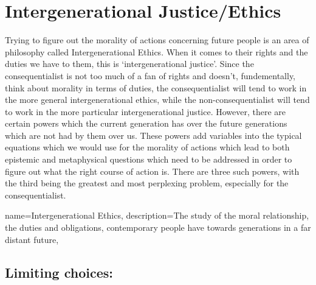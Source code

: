 \section{Intergenerational Justice/Ethics}

Trying to figure out the morality of actions concerning future people is an area of philosophy called \gls{Intergenerational Ethics}. When it comes to their rights and the duties we have to them, this is `intergenerational justice'. Since the consequentialist is not too much of a fan of rights and doesn't, fundementally, think about morality in terms of duties, the consequentialist will tend to work in the more general intergenerational ethics, while the non-consequentialist will tend to work in the more particular intergenerational justice. However, there are certain powers which the current generation has over the future generations which are not had by them over us. These powers add variables into the typical equations which we would use for the morality of actions which lead to both epistemic and metaphysical questions which need to be addressed in order to figure out what the right course of action is. There are three such powers, with the third being the greatest and most perplexing problem, especially for the consequentialist.

{
  name=Intergenerational Ethics,
  description={The study of the moral relationship, the duties and obligations, contemporary people have towards generations in a far distant future},
}


\subsection{Limiting choices:}

